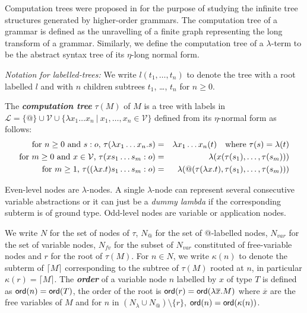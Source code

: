 \documentclass{llncs}
\newcommand\defname[1]{{\bf\em #1}\index{#1}}
\newcommand{\elnf}[1]{\lceil #1\rceil} %
\newcommand\ord[1]{{\sf ord}(#1)}
\newcommand\union{\cup}
\begin{document}
Computation trees were proposed in \cite{OngLics2006} for the purpose of studying the infinite tree structures generated by higher-order grammars. The computation tree of a grammar is defined as the unravelling of a finite graph representing the long transform of a grammar. Similarly, we define the computation tree of a $\lambda$-term to be the abstract syntax tree of its $\eta$-long normal form.

\emph{Notation for labelled-trees:} We write $l(t_1, \ldots, t_n)$ to denote the tree with a root labelled $l$ and with $n$ children subtrees $t_1$, \ldots, $t_n$ for $
n \geq 0$.

\begin{definition}
The \defname{computation tree} $\tau(M)$ of $M$ is
a tree with labels in $ \mathcal{L} = \{ @ \} \union \mathcal{V} \union \{ \lambda x_1 \ldots x_n \ | \ x_1 ,\ldots, x_n \in \mathcal{V} \}$ defined from its $\eta$-normal form as follows:
\begin{eqnarray*}
  \mbox{for $n\geq 0$ and $s:o$, } \tau(\lambda x_1 \ldots x_n . s) &=& \lambda x_1 \ldots x_n(t) \mbox{\quad where $\tau(s) = \lambda(t)$}\\
  \mbox{for $m\geq 0$ and $x \in  \mathcal{V}$, } \tau( x s_1 \ldots s_m : o) &=&  \lambda (x(\tau(s_1),\ldots,\tau(s_m)))\\
  \mbox{for $m \geq 1$, } \tau((\lambda x.t) s_1 \ldots s_m :o) &=& \lambda (@(\tau(\lambda x.t),\tau(s_1),\ldots,\tau(s_m)))
\end{eqnarray*}
\end{definition}

Even-level nodes are $\lambda$-nodes. A single $\lambda$-node can represent several consecutive variable abstractions or it can just be
a \textsl{dummy lambda} if the corresponding subterm is of ground type.
Odd-level nodes are variable or application nodes.

We write $N$ for the set of nodes of $\tau$, $N_@$ for the set of @-labelled nodes,
$N_{var}$ for the set of variable nodes,
$N_{fv}$ for the subset of $N_{var}$ constituted of free-variable nodes and $r$ for the root of $\tau(M)$.
For $n \in N$, we write $\kappa(n)$ to denote the subterm of $\elnf{M}$
corresponding to the subtree of $\tau(M)$ rooted at $n$, in particular $\kappa(r) = \elnf{M}$.
The \defname{order} of a variable node $n$ labelled by $x$ of type $T$ 
is defined as $\ord{n} = \ord{T}$, the order of the root is $\ord{r} = \ord{\lambda \overline{x} . M}$ where $\overline{x}$ are the free variables of $M$ and for $n$ in $(N_\lambda \union N_@) \setminus \{ r \}$, $\ord{n} = \ord{\kappa(n)}$.
\end{document}
